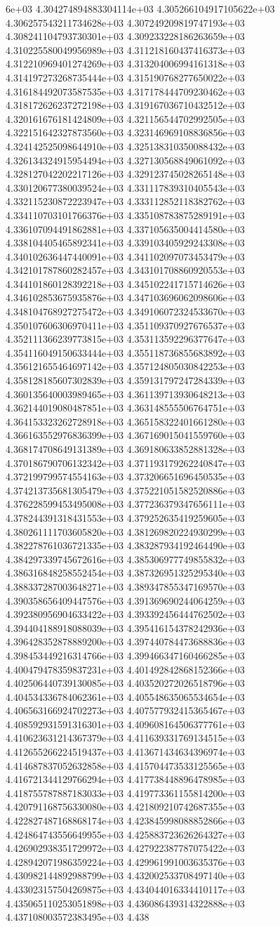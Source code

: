 6e+03	4.304274894883304114e+03	4.305266104917105622e+03	4.306257543211734628e+03	4.307249209819747193e+03	4.308241104793730301e+03	4.309233228186263659e+03	4.310225580049956989e+03	4.311218160437416373e+03	4.312210969401274269e+03	4.313204006994161318e+03	4.314197273268735444e+03	4.315190768277650022e+03	4.316184492073587535e+03	4.317178444709230462e+03	4.318172626237272198e+03	4.319167036710432512e+03	4.320161676181424809e+03	4.321156544702992505e+03	4.322151642327873560e+03	4.323146969108836856e+03	4.324142525098644910e+03	4.325138310350088432e+03	4.326134324915954494e+03	4.327130568849061092e+03	4.328127042202217126e+03	4.329123745028265148e+03	4.330120677380039524e+03	4.331117839310405543e+03	4.332115230872223947e+03	4.333112852118382762e+03	4.334110703101766376e+03	4.335108783875289191e+03	4.336107094491862881e+03	4.337105635004414580e+03	4.338104405465892341e+03	4.339103405929243308e+03	4.340102636447440091e+03	4.341102097073453479e+03	4.342101787860282457e+03	4.343101708860920553e+03	4.344101860128392218e+03	4.345102241715714626e+03	4.346102853675935876e+03	4.347103696062098606e+03	4.348104768927275472e+03	4.349106072324533670e+03	4.350107606306970411e+03	4.351109370927676537e+03	4.352111366239773815e+03	4.353113592296377647e+03	4.354116049150633444e+03	4.355118736855683892e+03	4.356121655464697142e+03	4.357124805030842253e+03	4.358128185607302839e+03	4.359131797247284339e+03	4.360135640003989465e+03	4.361139713930648213e+03	4.362144019080487851e+03	4.363148555506764751e+03	4.364153323262728918e+03	4.365158322401661280e+03	4.366163552976836399e+03	4.367169015041559760e+03	4.368174708649131389e+03	4.369180633852881328e+03	4.370186790706132342e+03	4.371193179262240847e+03	4.372199799574554163e+03	4.373206651696450535e+03	4.374213735681305479e+03	4.375221051582520886e+03	4.376228599453495008e+03	4.377236379347656111e+03	4.378244391318431553e+03	4.379252635419259605e+03	4.380261111703605820e+03	4.381269820224930299e+03	4.382278761036721335e+03	4.383287934192464490e+03	4.384297339745672616e+03	4.385306977749855832e+03	4.386316848258552454e+03	4.387326951325295340e+03	4.388337287003648271e+03	4.389347855347169570e+03	4.390358656409447576e+03	4.391369690244064259e+03	4.392380956904633422e+03	4.393392456444762502e+03	4.394404188918088039e+03	4.395416154378242936e+03	4.396428352878889200e+03	4.397440784473688836e+03	4.398453449216314766e+03	4.399466347160466285e+03	4.400479478359837231e+03	4.401492842868152366e+03	4.402506440739130085e+03	4.403520272026518796e+03	4.404534336784062361e+03	4.405548635065534654e+03	4.406563166924702273e+03	4.407577932415365467e+03	4.408592931591316301e+03	4.409608164506377761e+03	4.410623631214367379e+03	4.411639331769134515e+03	4.412655266224519437e+03	4.413671434634396974e+03	4.414687837052632858e+03	4.415704473533125565e+03	4.416721344129766294e+03	4.417738448896478985e+03	4.418755787887183033e+03	4.419773361155814200e+03	4.420791168756330080e+03	4.421809210742687355e+03	4.422827487168868174e+03	4.423845998088852866e+03	4.424864743556649955e+03	4.425883723626264327e+03	4.426902938351729972e+03	4.427922387787075422e+03	4.428942071986359224e+03	4.429961991003635376e+03	4.430982144892988799e+03	4.432002533708497140e+03	4.433023157504269875e+03	4.434044016334410117e+03	4.435065110253051898e+03	4.436086439314322888e+03	4.437108003572383495e+03	4.438